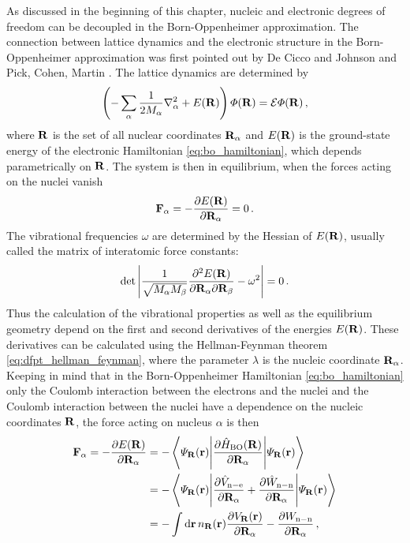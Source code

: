 \documentclass[main.tex]{subfiles}
\begin{document}
As discussed in the beginning of this chapter, nucleic and electronic degrees of freedom can be decoupled in the Born-Oppenheimer approximation.
The connection between lattice dynamics and the electronic structure in the Born-Oppenheimer approximation was first pointed out by De Cicco and Johnson  \cite{decicco_quantum_1969} and Pick, Cohen, Martin \cite{pick_microscopic_1970}.
The lattice dynamics are determined by
\begin{equation}
    \left( - \sum_{\alpha} \frac{1}{2 M_{\alpha}} \nabla^2_{\alpha} + E(\vb{R}) \right) \Phi (\vb{R}) = \mathcal{E} \Phi (\vb{R})\,,
\end{equation}
where \(\vb{R}\) is the set of all nuclear coordinates \(\vb{R}_{\alpha}\) and \(E(\vb{R})\) is the ground-state energy of the electronic Hamiltonian \ref{eq:bo_hamiltonian}, which depends parametrically on \(\vb{R}\).
The system is then in equilibrium, when the forces acting on the nuclei vanish
\begin{equation}
    \vb{F}_{\alpha} = - \pdv{E(\vb{R})}{\vb{R}_{\alpha}} = 0\,.
\end{equation}
The vibrational frequencies \(\omega\) are determined by the Hessian of \(E(\vb{R})\), usually called the matrix of interatomic force constants:
\begin{equation}
    \det \left\vert \frac{1}{\sqrt{M_{\alpha} M_{\beta}}} \pdv{E(\vb{R})}{\vb{R}_{\alpha}}{\vb{R}_{\beta}} - \omega^2 \right\vert = 0\,.
\end{equation}
Thus the calculation of the vibrational properties as well as the equilibrium geometry depend on the first and second derivatives of the energies \(E(\vb{R})\).
These derivatives can be calculated using the Hellman-Feynman theorem \ref{eq:dfpt_hellman_feynman}, where the parameter \(\lambda\) is the nucleic coordinate \(\vb{R}_{\alpha}\). 
Keeping in mind that in the Born-Oppenheimer Hamiltonian \ref{eq:bo_hamiltonian} only the Coulomb interaction between the electrons and the nuclei and the Coulomb interaction between the nuclei have a dependence on the nucleic coordinates \(\vb{R}\), the force acting on nucleus \(\alpha\) is then
\begin{align}
    \vb{F}_{\alpha} = - \pdv{E(\vb{R})}{\vb{R}_{\alpha}} &= - \mel**{\Psi_{\vb{R}}(\vb{r})}{\pdv{\hat{H}_{\mathrm{BO}} (\vb{R})}{\vb{R}_{\alpha}}}{\Psi_{\vb{R}}(\vb{r})} \\
    &= - \mel**{\Psi_{\vb{R}}(\vb{r})}{\pdv{\hat{V}_{\mathrm{n-e}}}{\vb{R}_{\alpha}} + \pdv{\hat{W}_{\mathrm{n-n}}}{\vb{R}_{\alpha}}}{\Psi_{\vb{R}}(\vb{r})} \\
    &= - \int \dd{\vb{r}} n_{\vb{R}} (\vb{r}) \pdv{V_{\vb{R}} (\vb{r})}{\vb{R}_{\alpha}} - \pdv{W_{\mathrm{n-n}}}{\vb{R}_{\alpha}}\,,
\end{align}
\end{document}
